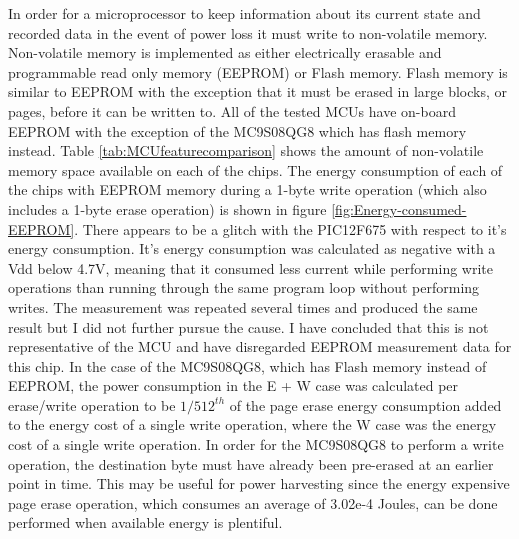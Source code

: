 In order for a microprocessor to keep information about its current
state and recorded data in the event of power loss it must write to
non-volatile memory. Non-volatile memory is implemented as either
electrically erasable and programmable read only memory (EEPROM) or
Flash memory. Flash memory is similar to EEPROM with the exception
that it must be erased in large blocks, or pages, before it can be
written to. All of the tested MCUs have on-board EEPROM with the exception
of the MC9S08QG8 which has flash memory instead. Table \ref{tab:MCUfeaturecomparison}
shows the amount of non-volatile memory space available on each of
the chips. The energy consumption of each of the chips with EEPROM
memory during a 1-byte write operation (which also includes a 1-byte
erase operation) is shown in figure \ref{fig:Energy-consumed-EEPROM}.
There appears to be a glitch with the PIC12F675 with respect to it's
energy consumption. It's energy consumption was calculated as negative
with a Vdd below 4.7V, meaning that it consumed less current while
performing write operations than running through the same program
loop without performing writes. The measurement was repeated several
times and produced the same result but I did not further pursue the
cause. I have concluded that this is not representative of the MCU
and have disregarded EEPROM measurement data for this chip. In the
case of the MC9S08QG8, which has Flash memory instead of EEPROM, the
power consumption in the E + W case was calculated per erase/write
operation to be $1/512^{th}$ of the page erase energy consumption
added to the energy cost of a single write operation, where the W
case was the energy cost of a single write operation. In order for
the MC9S08QG8 to perform a write operation, the destination byte must
have already been pre-erased at an earlier point in time. This may
be useful for power harvesting since the energy expensive page erase
operation, which consumes an average of 3.02e-4 Joules, can be done
performed when available energy is plentiful.

